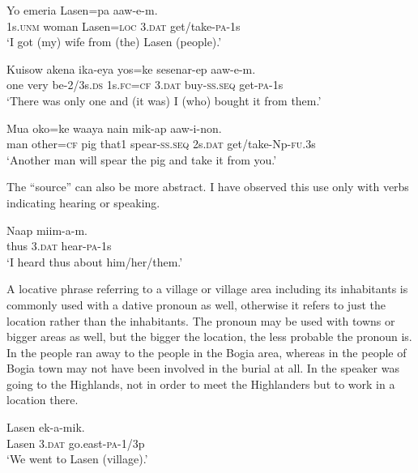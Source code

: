 \ea%
\label{ex:3:x579}
\gll Yo emeria Lasen=pa  aaw-e-m. \\
1s.\textsc{unm} woman Lasen=\textsc{loc} 3.\textsc{dat} get/take-\textsc{pa}-1s\\
\glt`I got (my) wife from (the) Lasen (people).'
\z

\ea%
\label{ex:3:x1784}
\gll Kuisow akena ika-eya yos=ke  sesenar-ep aaw-e-m. \\
one very be-2/3s.\textsc{ds} 1s.\textsc{fc}=\textsc{cf} 3.\textsc{dat} buy-\textsc{ss}.\textsc{seq} get-\textsc{pa}-1s\\
\glt`There was only one and (it was) I (who) bought it from them.'
\z

\ea%
\label{ex:3:x1785}
\gll Mua oko=ke waaya nain mik-ap  aaw-i-non. \\
man other=\textsc{cf} pig that1 spear-\textsc{ss}.\textsc{seq} 2s.\textsc{dat} get/take-Np-\textsc{fu}.3s\\
\glt`Another man will spear the pig and take it from you.'
\z

The ``source'' can also be more abstract. I have observed this use only with verbs indicating hearing or speaking.

\ea%
\label{ex:3:x1786}
\gll Naap  miim-a-m. \\
thus 3.\textsc{dat} hear-\textsc{pa}-1s\\
\glt`I heard thus about him/her/them.'
\z

A locative phrase referring to a village or village area including its inhabitants is commonly used with a dative pronoun as well, otherwise it refers to just the location rather than the inhabitants. The pronoun may be used with towns or bigger areas as well, but the bigger the location, the less probable the pronoun is. In  the people ran away to the people in the Bogia area, whereas in  the people of Bogia town may not have been involved in the burial at all. In  the speaker was going to the Highlands, not in order to meet the Highlanders but to work in a location there. 

\ea%
\label{ex:3:x586}
\gll Lasen  ek-a-mik. \\
Lasen 3.\textsc{dat} go.east-\textsc{pa}-1/3p\\
\glt`We went to Lasen (village).'
\z

